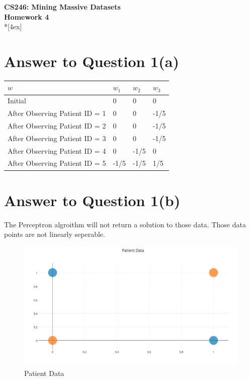 \documentclass[11pt]{article}
\begin{document}
\thispagestyle{empty}
\parindent 0pt
\vfill
\large

\begin{center}
\LARGE{\bf \textsf{CS246: Mining Massive Datasets}}\\ {\bf \textsf{Homework 4}}
\\*[4ex]
\end{center}

\section*{Answer to Question 1(a)}
\begin{table}[h]
\centering
\label{my-label}
\begin{tabular}{|l|l|l|l|}
\hline
$w$                            & $w_1$& $w_2$& $w_3$\\ \hline
Initial                        & 0    & 0    & 0    \\
After Observing Patient ID = 1 & 0    & 0    & -1/5 \\
After Observing Patient ID = 2 & 0    & 0    & -1/5 \\
After Observing Patient ID = 3 & 0    & 0    & -1/5 \\
After Observing Patient ID = 4 & 0    & -1/5 & 0    \\
After Observing Patient ID = 5 & -1/5 & -1/5 & 1/5  \\ \hline
\end{tabular}
\end{table}

\pagebreak[4]
\section*{Answer to Question 1(b)}
The Perceptron algroithm will not return a solution to those data.
Those data points are not linearly seperable.

\begin{figure}[h]
\center
\includegraphics[scale=0.4]{patientData.png}
\caption{Patient Data}
\end{figure}
\end{document}
